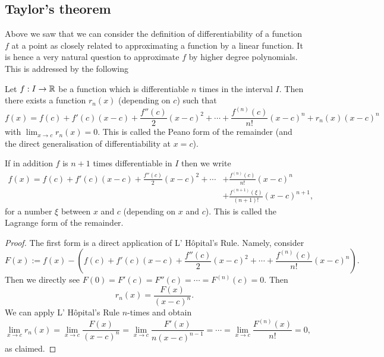 \documentclass[10pt, a4paper]{article}
\newcommand{\lhopital}[0]{L' H\^opital}
\begin{document}
\subsection{Taylor's theorem}

Above we saw that we can consider the definition of differentiability of a function $f$ at a point as closely related to approximating a function by a linear function.
It is hence a very natural question to approximate $f$ by higher degree polynomials.
This is addressed by the following
\begin{theorem}\label{pre:analy:thm:taylorsthm}
    Let $f : I \rightarrow \mathbb{R}$ be a function which is differentiable $n$ times in the interval $I$.
    Then there exists a function $r_n(x)$
    (depending on $c$)
    such that
    \begin{equation}\label{pre:analy:eq:2}
        f(x) = f(c) + f'(c)(x - c) + \frac{f''(c)}{2}(x - c) ^ 2 + \dotsi + \frac{f ^ {(n)}(c)}{n!}(x - c) ^ n + r_n(x)(x - c) ^ n
    \end{equation}
    with $\lim_{x \rightarrow c}r_n(x) = 0$.
    This is called the Peano form of the remainder
    (and the direct generalisation of differentiability at $x = c$).

    If in addition $f$ is $n + 1$ times differentiable in $I$ then we write
    \begin{align*}
        f(x) = f(c) + f'(c)(x - c) + \frac{f''(c)}{2}(x - c) ^ 2 + \dotsi &+ \frac{f ^ {(n)}(c)}{n!}(x - c) ^ n \\
        &+ \frac{f ^ {(n + 1)}(\xi)}{(n + 1)!}(x - c) ^ {n + 1},
    \end{align*}
    for a number $\xi$ between $x$ and $c$
    (depending on $x$ and $c$).
    This is called the Lagrange form of the remainder.
    \begin{proof}
        The first form is a direct application of \lhopital's Rule.
        Namely,
        consider
        \[
        F(x) := f(x) - \left(f(c) + f'(c)(x - c) + \frac{f''(c)}{2}(x - c) ^ 2 + \dotsi + \frac{f ^ {(n)}(c)}{n!}(x - c) ^ n\right).
        \]
        Then we directly see $F(0) = F'(c) = F''(c) = \dotsi = F ^ {(n)}(c) = 0$.
        Then
        \[
        r_n(x) = \frac{F(x)}{(x - c) ^ n}.
        \]
        We can apply \lhopital's Rule $n$-times and obtain
        \[
        \lim_{x \rightarrow c}r_n(x) = \lim_{x \rightarrow c}\frac{F(x)}{(x - c) ^ n} = \lim_{x \rightarrow c}\frac{F'(x)}{n(x - c) ^ {n - 1}} = \dotsi = \lim_{x \rightarrow c}\frac{F ^ {(n)}(x)}{n!} = 0,
        \]
        as claimed.


\end{proof}
\end{theorem}
\end{document}
